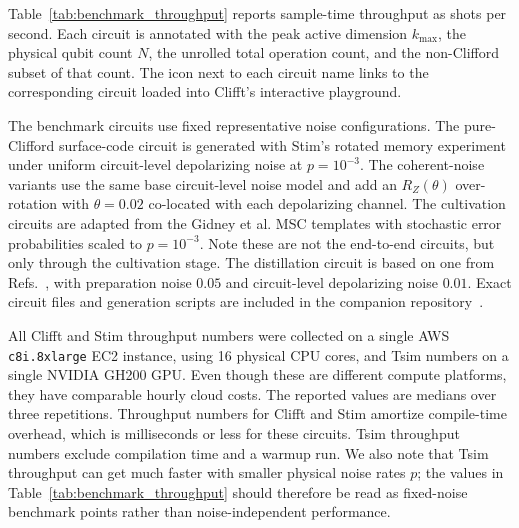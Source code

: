\documentclass[a4paper, onecolumn, unpublished]{quantumarticle}
\begin{document}
    Table~\ref{tab:benchmark_throughput} reports sample-time throughput as shots per second. Each circuit is annotated with the peak active dimension $k_{\max}$, the physical qubit count $N$, the unrolled total operation count, and the non-Clifford subset of that count. The \faPlay{} icon next to each circuit name links to the corresponding circuit loaded into Clifft's interactive playground.

    The benchmark circuits use fixed representative noise configurations. The pure-Clifford surface-code circuit is generated with Stim's rotated memory experiment under uniform circuit-level depolarizing noise at $p=10^{-3}$. The coherent-noise variants use the same base circuit-level noise model and add an $R_Z(\theta)$ over-rotation with $\theta=0.02$ co-located with each depolarizing channel. The cultivation circuits are adapted from the Gidney et al.\cite{gidneyMagicStateCultivation2024} MSC templates with stochastic error probabilities scaled to $p=10^{-3}$. Note these are not the end-to-end circuits, but only through the cultivation stage. The distillation circuit is based on one from Refs.~\cite{salesrodriguezExperimentalDemonstrationLogical2025,haenelTsimFastUniversal2026}, with preparation noise $0.05$ and circuit-level depolarizing noise $0.01$. Exact circuit files and generation scripts are included in the companion repository~\cite{clifftPaperRepo}.

    All Clifft and Stim throughput numbers were collected on a single AWS \texttt{c8i.8xlarge} EC2 instance, using 16 physical CPU cores, and Tsim numbers on a single NVIDIA GH200 GPU. Even though these are different compute platforms, they have comparable hourly cloud costs. The reported values are medians over three repetitions. Throughput numbers for Clifft and Stim amortize compile-time overhead, which is milliseconds or less for these circuits. Tsim throughput numbers exclude compilation time and a warmup run. We also note that Tsim throughput can get much faster with smaller physical noise rates $p$; the values in Table~\ref{tab:benchmark_throughput} should therefore be read as fixed-noise benchmark points rather than noise-independent performance.
\end{document}
